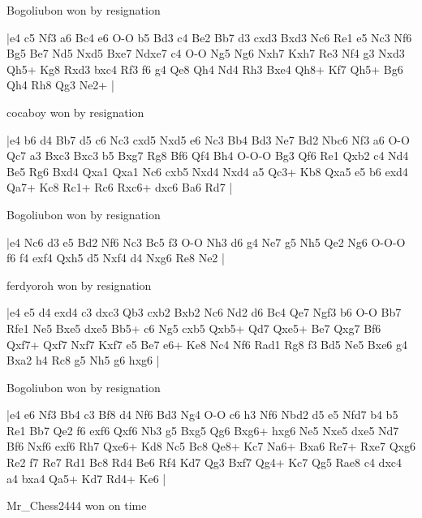 \showboard

Bogoliubon won by resignation

\makegametitle
|e4 c5 Nf3 a6 Bc4 e6 O-O b5 Bd3 c4 Be2 Bb7 d3 cxd3 Bxd3 Nc6 Re1 e5 Nc3 Nf6 Bg5 Be7 Nd5 Nxd5 Bxe7 Ndxe7 c4 O-O Ng5 Ng6 Nxh7 Kxh7 Re3 Nf4 g3 Nxd3 Qh5+ Kg8 Rxd3 bxc4 Rf3 f6 g4 Qe8 Qh4 Nd4 Rh3 Bxe4 Qh8+ Kf7 Qh5+ Bg6 Qh4 Rh8 Qg3 Ne2+  |

\showboard

cocaboy won by resignation

\makegametitle
|e4 b6 d4 Bb7 d5 c6 Nc3 cxd5 Nxd5 e6 Nc3 Bb4 Bd3 Ne7 Bd2 Nbc6 Nf3 a6 O-O Qc7 a3 Bxc3 Bxc3 b5 Bxg7 Rg8 Bf6 Qf4 Bh4 O-O-O Bg3 Qf6 Re1 Qxb2 c4 Nd4 Be5 Rg6 Bxd4 Qxa1 Qxa1 Nc6 cxb5 Nxd4 Nxd4 a5 Qc3+ Kb8 Qxa5 e5 b6 exd4 Qa7+ Kc8 Rc1+ Rc6 Rxc6+ dxc6 Ba6 Rd7  |

\showboard

Bogoliubon won by resignation

\makegametitle
|e4 Nc6 d3 e5 Bd2 Nf6 Nc3 Bc5 f3 O-O Nh3 d6 g4 Ne7 g5 Nh5 Qe2 Ng6 O-O-O f6 f4 exf4 Qxh5 d5 Nxf4 d4 Nxg6 Re8 Ne2  |

\showboard

ferdyoroh won by resignation

\makegametitle
|e4 e5 d4 exd4 c3 dxc3 Qb3 cxb2 Bxb2 Nc6 Nd2 d6 Bc4 Qe7 Ngf3 b6 O-O Bb7 Rfe1 Ne5 Bxe5 dxe5 Bb5+ c6 Ng5 cxb5 Qxb5+ Qd7 Qxe5+ Be7 Qxg7 Bf6 Qxf7+ Qxf7 Nxf7 Kxf7 e5 Be7 e6+ Ke8 Nc4 Nf6 Rad1 Rg8 f3 Bd5 Ne5 Bxe6 g4 Bxa2 h4 Rc8 g5 Nh5 g6 hxg6  |

\showboard

Bogoliubon won by resignation

\makegametitle
|e4 e6 Nf3 Bb4 c3 Bf8 d4 Nf6 Bd3 Ng4 O-O c6 h3 Nf6 Nbd2 d5 e5 Nfd7 b4 b5 Re1 Bb7 Qe2 f6 exf6 Qxf6 Nb3 g5 Bxg5 Qg6 Bxg6+ hxg6 Ne5 Nxe5 dxe5 Nd7 Bf6 Nxf6 exf6 Rh7 Qxe6+ Kd8 Nc5 Bc8 Qe8+ Kc7 Na6+ Bxa6 Re7+ Rxe7 Qxg6 Re2 f7 Re7 Rd1 Bc8 Rd4 Be6 Rf4 Kd7 Qg3 Bxf7 Qg4+ Kc7 Qg5 Rae8 c4 dxc4 a4 bxa4 Qa5+ Kd7 Rd4+ Ke6  |

\showboard

Mr\_Chess2444 won on time

